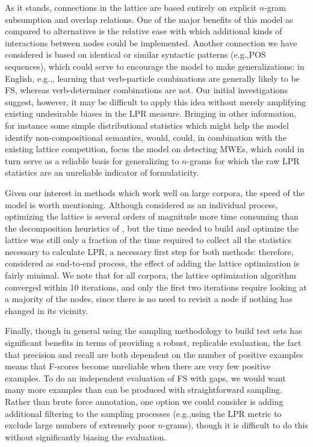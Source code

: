\documentclass[11pt,letterpaper]{article}
\makeatletter
\def \eg {e.g.,\@ }
\makeatother
\begin{document}
As it stands, connections in the lattice are based entirely on explicit $n$-gram subsumption and overlap relations. One of the major benefits of this model as compared to alternatives is the relative ease with which additional kinds of interactions between nodes could be implemented. Another connection we have considered is based on identical or similar syntactic patterns (\eg POS sequences), which could serve to encourage the model to make generalizations: in English, \eg, learning that verb-particle combinations are generally likely to be FS, whereas verb-determiner combinations are not. Our initial investigations suggest, however, it may be difficult to apply this idea without merely amplifying existing undesirable biases in the LPR measure. Bringing in other information, for instance some simple distributional statistics which might help the model identify non-compositional semantics, would, could, in combination with the existing lattice competition, focus the model on detecting MWEs, which could in turn serve as a reliable basis for generalizing to $n$-grams for which the raw LPR statistics are an unreliable indicator of formulaticity.

Given our interest in methods which work well on large corpora, the speed of the model is worth mentioning. Although considered as an individual process, optimizing the lattice is several orders of magnitude more time consuming than the decomposition heuristics of , but the time needed to build and optimize the lattice was still only a fraction of the time required to collect all the statistics necessary to calculate LPR, a necessary first step for both methods: therefore, considered as end-to-end process, the effect of adding the lattice optimization is fairly minimal. We note that for all corpora, the lattice optimization algorithm converged within 10 iterations, and only the first two iterations require looking at a majority of the nodes, since there is no need to revisit a node if nothing has changed in its vicinity.

Finally, though in general using the sampling methodology to build test sets has significant benefits in terms of providing a robust, replicable evaluation, the fact that precision and recall are both dependent on the number of positive examples means that F-scores become unreliable when there are very few positive examples. To do an independent evaluation of FS with gaps, we would want many more examples than can be produced with straightforward sampling. Rather than brute force annotation, one option we could consider is adding additional filtering to the sampling processes (\eg using the LPR metric to exclude large numbers of extremely poor $n$-grams), though it is difficult to do this without significantly biasing the evaluation.
\end{document}
